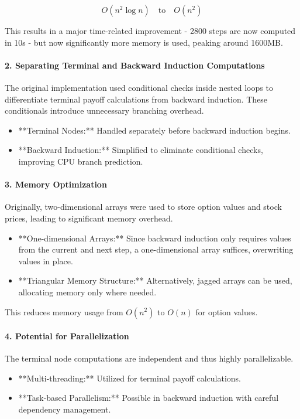 \documentclass{article}
\begin{document}
    \[
        O(n^2 \log n) \quad \text{to} \quad O(n^2)
    \]

    This results in a major time-related improvement - 2800 steps are now computed in 10s - but now significantly more memory is used, peaking around 1600MB.

    \paragraph{2. Separating Terminal and Backward Induction Computations}
    The original implementation used conditional checks inside nested loops to differentiate terminal payoff calculations from backward induction. These conditionals introduce unnecessary branching overhead.

    \begin{itemize}
        \item **Terminal Nodes:** Handled separately before backward induction begins.
        \item **Backward Induction:** Simplified to eliminate conditional checks, improving CPU branch prediction.
    \end{itemize}

    \paragraph{3. Memory Optimization}
    Originally, two-dimensional arrays were used to store option values and stock prices, leading to significant memory overhead.

    \begin{itemize}
        \item **One-dimensional Arrays:** Since backward induction only requires values from the current and next step, a one-dimensional array suffices, overwriting values in place.
        \item **Triangular Memory Structure:** Alternatively, jagged arrays can be used, allocating memory only where needed.
    \end{itemize}

    This reduces memory usage from \(O(n^2)\) to \(O(n)\) for option values.

    \paragraph{4. Potential for Parallelization}
    The terminal node computations are independent and thus highly parallelizable.

    \begin{itemize}
        \item **Multi-threading:** Utilized for terminal payoff calculations.
        \item **Task-based Parallelism:** Possible in backward induction with careful dependency management.
    \end{itemize}
\end{document}
